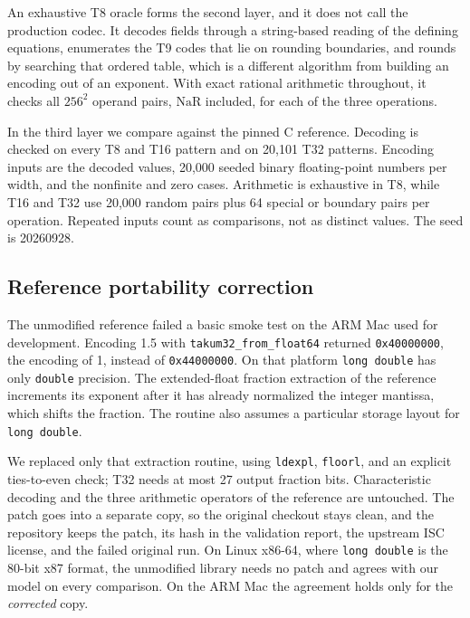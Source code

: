 \documentclass[conference]{IEEEtran}
\newcommand{\NaR}{\mathrm{NaR}}
\newcommand{\code}[1]{\texttt{#1}}
\begin{document}
An exhaustive T8 oracle forms the second layer, and it does not call the
production codec. It decodes fields through a string-based reading of the
defining equations, enumerates the T9 codes that lie on rounding boundaries, and
rounds by searching that ordered table, which is a different algorithm from
building an encoding out of an exponent. With exact rational arithmetic
throughout, it checks all $256^2$ operand pairs, $\NaR$ included, for each of
the three operations.

In the third layer we compare against the pinned C reference. Decoding is
checked on every T8 and T16 pattern and on 20,101 T32 patterns. Encoding inputs
are the decoded values, 20,000 seeded binary floating-point numbers per width,
and the nonfinite and zero cases. Arithmetic is exhaustive in T8, while T16 and
T32 use 20,000 random pairs plus 64 special or boundary pairs per operation.
Repeated inputs count as comparisons, not as distinct values. The seed is
20260928.

\subsection{Reference portability correction}
The unmodified reference failed a basic smoke test on the ARM Mac used for
development. Encoding 1.5 with \code{takum32\_from\_float64} returned
\code{0x40000000}, the encoding of 1, instead of \code{0x44000000}. On that platform \code{long double}
has only \code{double} precision. The extended-float fraction extraction of the
reference increments its exponent after it has already normalized the integer
mantissa, which shifts the fraction. The routine also assumes a particular
storage layout for \code{long double}.

We replaced only that extraction routine, using \code{ldexpl}, \code{floorl},
and an explicit ties-to-even check; T32 needs at most 27 output fraction bits.
Characteristic decoding and the three arithmetic operators of the reference are
untouched. The patch goes into a separate copy, so the original checkout stays
clean, and the repository keeps the patch, its hash in the validation report,
the upstream ISC license, and the failed original run. On Linux x86-64, where
\code{long double} is the 80-bit x87 format, the unmodified library needs no
patch and agrees with our model on every comparison. On the ARM Mac the
agreement holds only for the \emph{corrected} copy.
\end{document}
